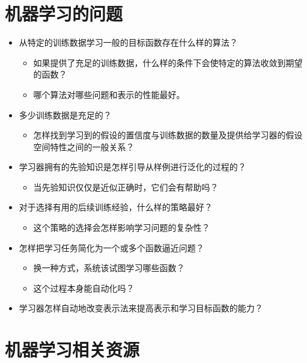 \documentclass[aspectratio=169]{beamer}
\begin{document}
\section{机器学习的问题}
\label{sec:org59d022e}

\begin{itemize}
\item 从特定的训练数据学习一般的目标函数存在什么样的算法？
\begin{itemize}
\item 如果提供了充足的训练数据，什么样的条件下会使特定的算法收敛到期望的函数？
\item 哪个算法对哪些问题和表示的性能最好。
\end{itemize}
\item 多少训练数据是充足的？
\begin{itemize}
\item 怎样找到学习到的假设的置信度与训练数据的数量及提供给学习器的假设空间特性之间的一般关系？
\end{itemize}
\item 学习器拥有的先验知识是怎样引导从样例进行泛化的过程的？
\begin{itemize}
\item 当先验知识仅仅是近似正确时，它们会有帮助吗？
\end{itemize}
\item 对于选择有用的后续训练经验，什么样的策略最好？
\begin{itemize}
\item 这个策略的选择会怎样影响学习问题的复杂性？
\end{itemize}
\item 怎样把学习任务简化为一个或多个函数逼近问题？
\begin{itemize}
\item 换一种方式，系统该试图学习哪些函数？
\item 这个过程本身能自动化吗？
\end{itemize}
\item 学习器怎样自动地改变表示法来提高表示和学习目标函数的能力？
\end{itemize}
\section{机器学习相关资源}
\label{sec:orge8a9e9a}
\end{document}
